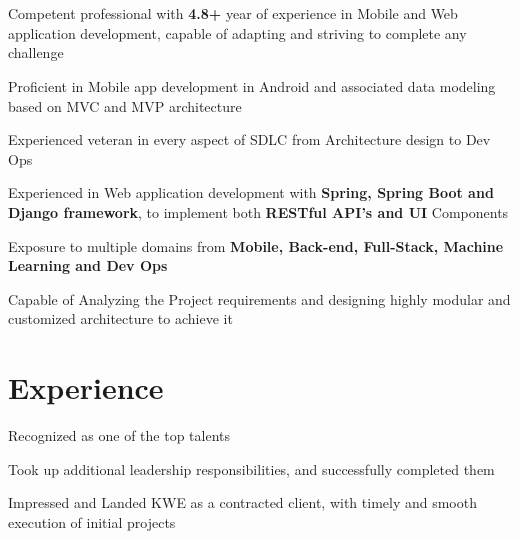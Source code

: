 \documentclass[]{deedy-resume-openfont}
\begin{document}
    
%
%
%
%
\section{}
\raggedright

\begin{tightemize}
	\item Competent professional with \textbf{4.8+} year of experience in Mobile and Web application development, capable of adapting and striving to complete any challenge
	\item Proficient in Mobile app development in Android and associated data modeling based on MVC and MVP architecture
	\item Experienced veteran in every aspect of SDLC from Architecture design to Dev Ops
	\item Experienced in Web application development with \textbf{Spring, Spring Boot and Django framework}, to implement both \textbf{RESTful API's and UI} Components
	\item Exposure to multiple domains from \textbf{Mobile, Back-end, Full-Stack, Machine Learning and Dev Ops}
	\item Capable of Analyzing the Project requirements and designing highly modular and customized architecture to achieve it
\end{tightemize}
\sectionsep
%
%
\section{Experience}
\hfill {}
\begin{tightemize}
	\item Recognized as one of the top talents
	\item Took up additional leadership responsibilities, and successfully completed them
	\item Impressed and Landed KWE as a contracted client, with timely and smooth execution of initial projects
\end{tightemize}
\sectionsep
%
%
\end{document}
